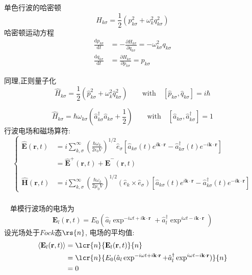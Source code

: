 \begin{frame}
      \frametitle{}
      单色行波的哈密顿
      \[ H_{k\sigma} = \frac{1}{2} (p_{k\sigma} ^2 + \omega_k ^2 q_{k\sigma} ^2)\]
      哈密顿运动方程
        \[ \begin{aligned}
        \frac{\mathrm{d}p_{k\sigma}}{\mathrm{d}t} &= - \frac{\partial H_{k\sigma}}{\partial q_{k\sigma}} = - \omega ^2 _{k\sigma} q_{k\sigma} \\ 
        \frac{\mathrm{d}q_{k\sigma}}{\mathrm{d}t} &= \frac{\partial H_{k\sigma}}{\partial p_{k\sigma}} =p_{k\sigma}
        \end{aligned} 
      \] 
\end{frame}

\begin{frame}        
      同理,正则量子化
      \[ \hat{H}_{k\sigma} = \frac{1}{2} (\hat{p}_{k\sigma} ^2 + \omega_k ^2 \hat{q}_{k\sigma} ^2) \qquad \text{with} \quad [\hat{p}_{k\sigma},\hat{q}_{k\sigma}] =i\hbar \]

      \[ \hat{H}_{k\sigma}= \hbar \omega_{k\sigma} \left(\hat{a}^\dagger _{k\sigma} \hat{a} _{k\sigma}+ \frac{1 }{2}\right) \qquad \text{with} \quad [\hat{a} _{k\sigma},\hat{a}^\dagger _{k\sigma}]=1 \]
      行波电场和磁场算符:
      \[ \begin{cases}
        \hat{\mathbf{E}} (\mathbf{r},t)&=i \sum^\infty _{k,\sigma} (\frac{\hbar\omega_k}{2 \epsilon_0 V } )^{1/2} \hat{e}_\sigma [ \hat{a} _{k\sigma} (t) e^{i \mathbf{k}\cdot \mathbf{r}} - \hat{a} ^\dagger _{k\sigma} (t)  e^{-i \mathbf{k}\cdot \mathbf{r}}] \\
        &= \hat{\mathbf{E}}^+(\mathbf{r},t)+ \hat{\mathbf{E}}^-(\mathbf{r},t) \\
        ~\\
      \hat{\mathbf{H}} (\mathbf{r},t) &=i \sum^\infty _{k,\sigma} (\frac{\hbar\omega_k}{2 \mu_0 V } )^{1/2} (\hat{e}_k \times \hat{e}_\sigma) [ \hat{a} _{k\sigma} (t) e^{i \mathbf{k}\cdot \mathbf{r}} - \hat{a} ^\dagger _{k\sigma} (t)  e^{-i \mathbf{k}\cdot \mathbf{r}}] 
      \end{cases} \]
\end{frame}

\begin{frame}
  \frametitle{}
  \解~ 单模行波场的电场为
  \[ \mathbf{E}_l(\mathbf{r},t) = E_{0} (\hat{a}_l\exp^{-i \omega t + i \mathbf{k}\cdot \mathbf{r}} + \hat{a}_l ^\dagger \exp^{i \omega t - i \mathbf{k}\cdot \mathbf{r}})\]
  设光场处于$Fock$态$\rs{n}$, 电场的平均值: 
\[ 
\begin{aligned}
        \left\langle \mathbf{E}_l(\mathbf{r},t) \right\rangle &=\lcr{n}{\mathbf{E}_l(\mathbf{r},t)}{n} \\  
        &= \lcr{n}{E_{0} (\hat{a}_l \exp^{-i \omega t + i \mathbf{k}\cdot \mathbf{r}} +\hat{a}_l ^\dagger \exp^{i \omega t - i \mathbf{k}\cdot \mathbf{r}})}{n}\\ 
        &=0 
\end{aligned}\]
\end{frame}

